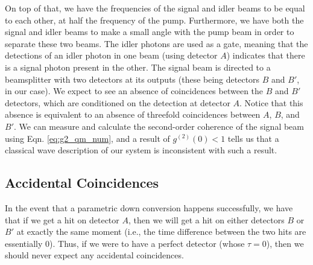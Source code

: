 \documentclass[twocolumn,amsmath,amssymb,pra]{revtex4-2}
\begin{document}
On top of that, we have the frequencies of the signal and idler beams to be equal to each other, at half the frequency of the pump. Furthermore, we have both the signal and idler beams to make a small angle with the pump beam in order to separate these two beams. The idler photons are used as a gate, meaning that the detections of an idler photon in one beam (using detector $A$) indicates that there is a signal photon present in the other. The signal beam is directed to a beamsplitter with two detectors at its outputs (these being detectors $B$ and $B'$, in our case). We expect to see an absence of coincidences between the $B$ and $B'$ detectors, which are conditioned on the detection at detector $A$. Notice that this absence is equivalent to an absence of threefold coincidences between $A$, $B$, and $B'$. We can measure and calculate the second-order coherence of the signal beam using Eqn. \ref{eq:g2_qm_num}, and a result of $g^{(2)}(0) < 1$ tells us that a classical wave description of our system is inconsistent with such a result.

\subsection{Accidental Coincidences}
In the event that a parametric down conversion happens successfully, we have that if we get a hit on detector $A$, then we will get a hit on either detectors $B$ or $B'$ at exactly the same moment (i.e., the time difference between the two hits are essentially 0). Thus, if we were to have a perfect detector (whose $\tau = 0$), then we should never expect any accidental coincidences. 
\end{document}
